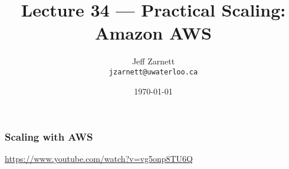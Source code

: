 

\title{Lecture 34 --- Practical Scaling: Amazon AWS }

\author{Jeff Zarnett \\ \small \texttt{jzarnett@uwaterloo.ca}}
\date{\today}




\begin{frame}
  \titlepage

 \end{frame}

\begin{frame}
\frametitle{Scaling with AWS}

\begin{center}
\url{https://www.youtube.com/watch?v=vg5onp8TU6Q}
\end{center}


\end{frame}



